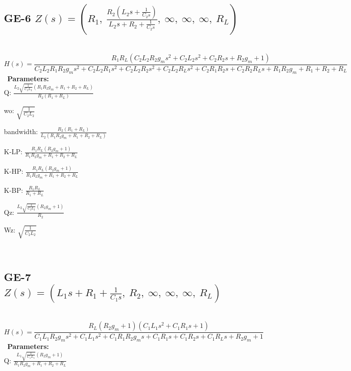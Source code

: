 \documentclass{article}
\begin{document}
\ 

\subsection{GE-6 $Z(s) = \left( R_{1}, \  \frac{R_{2} \left(L_{2} s + \frac{1}{C_{2} s}\right)}{L_{2} s + R_{2} + \frac{1}{C_{2} s}}, \  \infty, \  \infty, \  \infty, \  R_{L}\right)$ } \ 
\textbf{\[H(s) = \frac{R_{1} R_{L} \left(C_{2} L_{2} R_{2} g_{m} s^{2} + C_{2} L_{2} s^{2} + C_{2} R_{2} s + R_{2} g_{m} + 1\right)}{C_{2} L_{2} R_{1} R_{2} g_{m} s^{2} + C_{2} L_{2} R_{1} s^{2} + C_{2} L_{2} R_{2} s^{2} + C_{2} L_{2} R_{L} s^{2} + C_{2} R_{1} R_{2} s + C_{2} R_{2} R_{L} s + R_{1} R_{2} g_{m} + R_{1} + R_{2} + R_{L}}\] } \ 
\textbf{Parameters:}\\ 

Q: $\frac{L_{2} \sqrt{\frac{1}{C_{2} L_{2}}} \left(R_{1} R_{2} g_{m} + R_{1} + R_{2} + R_{L}\right)}{R_{2} \left(R_{1} + R_{L}\right)}$\ 

wo: $\sqrt{\frac{1}{C_{2} L_{2}}}$\ 

bandwidth: $\frac{R_{2} \left(R_{1} + R_{L}\right)}{L_{2} \left(R_{1} R_{2} g_{m} + R_{1} + R_{2} + R_{L}\right)}$\ 

K-LP: $\frac{R_{1} R_{L} \left(R_{2} g_{m} + 1\right)}{R_{1} R_{2} g_{m} + R_{1} + R_{2} + R_{L}}$\ 

K-HP: $\frac{R_{1} R_{L} \left(R_{2} g_{m} + 1\right)}{R_{1} R_{2} g_{m} + R_{1} + R_{2} + R_{L}}$\ 

K-BP: $\frac{R_{1} R_{L}}{R_{1} + R_{L}}$\ 

Qz: $\frac{L_{2} \sqrt{\frac{1}{C_{2} L_{2}}} \left(R_{2} g_{m} + 1\right)}{R_{2}}$\ 

Wz: $\sqrt{\frac{1}{C_{2} L_{2}}}$\ 

\ 

\subsection{GE-7 $Z(s) = \left( L_{1} s + R_{1} + \frac{1}{C_{1} s}, \  R_{2}, \  \infty, \  \infty, \  \infty, \  R_{L}\right)$ } \ 
\textbf{\[H(s) = \frac{R_{L} \left(R_{2} g_{m} + 1\right) \left(C_{1} L_{1} s^{2} + C_{1} R_{1} s + 1\right)}{C_{1} L_{1} R_{2} g_{m} s^{2} + C_{1} L_{1} s^{2} + C_{1} R_{1} R_{2} g_{m} s + C_{1} R_{1} s + C_{1} R_{2} s + C_{1} R_{L} s + R_{2} g_{m} + 1}\] } \ 
\textbf{Parameters:}\\ 

Q: $\frac{L_{1} \sqrt{\frac{1}{C_{1} L_{1}}} \left(R_{2} g_{m} + 1\right)}{R_{1} R_{2} g_{m} + R_{1} + R_{2} + R_{L}}$\ 
\end{document}
